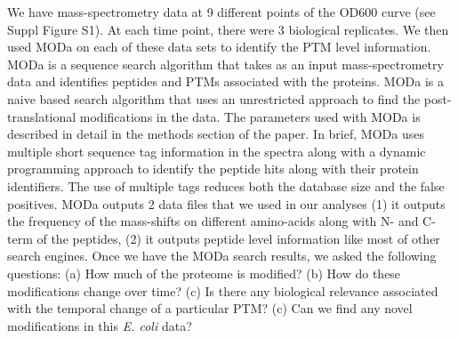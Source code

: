 \documentclass[12pt]{article}
\begin{document}
We have mass-spectrometry data at 9 different points of the OD600 curve (see Suppl Figure S1). At each time point, there were 3 biological replicates. We then used MODa on each of these data sets to identify the PTM level information. MODa is a sequence search algorithm that takes as an input mass-spectrometry data and identifies peptides and PTMs associated with the proteins. MODa is a naive based search algorithm that uses an unrestricted approach to find the post-translational modifications in the data. The parameters used with MODa is described in detail in the methods section of the paper. In brief, MODa uses multiple short sequence tag information in the spectra along with a dynamic programming approach to identify the peptide hits along with their protein identifiers. The use of multiple tags reduces both the database size and the false positives. MODa outputs 2 data files that we used in our analyses (1) it outputs the frequency of the mass-shifts on different amino-acids along with N- and C- term of the peptides, (2) it outputs peptide level information like most of other search engines. Once we have the MODa search results, we asked the following questions: (a) How much of the proteome is modified? (b) How do these modifications change over time? (c) Is there any biological relevance associated with the temporal change of a particular PTM? (c) Can we find any novel modifications in this \emph{E. coli} data? 


\end{document}
